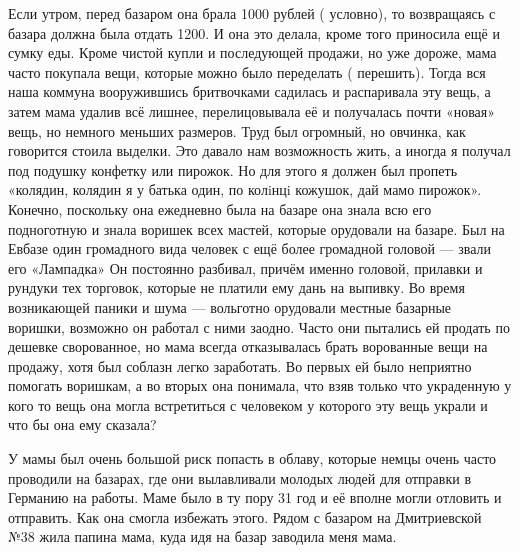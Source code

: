 Если утром, перед базаром она брала 1000 рублей ( условно), то
возвращаясь с базара должна была отдать 1200. И она это делала, кроме того
приносила ещё и сумку еды. Кроме чистой купли и последующей продажи, но уже
дороже, мама часто покупала вещи, которые можно было переделать ( перешить).
Тогда вся наша коммуна вооружившись бритвочками  садилась и распаривала эту
вещь, а затем мама удалив  всё лишнее, перелицовывала её и получалась почти
«новая» вещь, но немного меньших размеров. Труд был огромный, но овчинка, как
говорится стоила выделки. Это давало нам возможность жить, а иногда я получал
под подушку конфетку или пирожок. Но для этого я должен был пропеть «колядин,
колядин я у батька один, по колiнцi кожушок, дай мамо пирожок». Конечно,
поскольку она ежедневно была на базаре она знала всю его подноготную и знала
воришек всех мастей, которые орудовали на базаре. Был на Евбазе один громадного
вида человек  с  ещё более громадной головой — звали его  «Лампадка» Он
постоянно разбивал, причём именно головой, прилавки и рундуки тех торговок,
которые не платили ему дань на выпивку. Во время возникающей паники и шума —
вольготно  орудовали местные базарные воришки, возможно он работал с ними
заодно. Часто они пытались ей продать по дешевке сворованное, но мама всегда
отказывалась брать ворованные вещи на продажу, хотя был соблазн легко
заработать. Во первых ей было неприятно помогать воришкам, а во вторых она
понимала, что взяв только что украденную у кого то вещь  она  могла
встретиться  с человеком у которого эту вещь украли и что бы она ему сказала?

У мамы был очень большой риск попасть в облаву, которые немцы очень часто
проводили на базарах, где они вылавливали молодых людей для отправки в Германию
на работы. Маме было в ту пору 31 год и её вполне могли отловить и отправить.
Как она смогла избежать этого. Рядом с базаром на Дмитриевской №38 жила папина
мама, куда идя на базар заводила меня мама. 

\raggedcolumns
\begin{multicols}{3} %
\setlength{\parindent}{0pt}




\end{multicols} %

